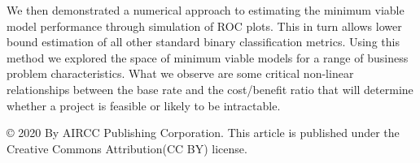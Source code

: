 \documentclass[11pt,a4paper]{article}
\begin{document}
We then demonstrated a numerical approach to estimating the minimum viable model performance through simulation
of ROC plots. This in turn allows lower bound estimation of all other standard binary classification metrics.
Using this method we explored the space of minimum viable models for a range of business problem characteristics.
What we observe are some critical non-linear
relationships between the base rate and the cost/benefit ratio that will determine whether a project
is feasible or likely to be intractable.


{}


\hfill \break
\hfill \break
\hfill \break
 \fontsize{10pt}{1em}\selectfont © 2020 By AIRCC Publishing Corporation. This article is published under the Creative Commons Attribution(CC BY) license.
\end{document}
